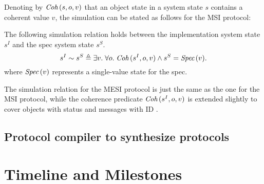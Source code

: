Denoting by $\textit{Coh}\,(s, o, v)$ that an object state in a system state $s$ contains a coherent value $v$, the simulation can be stated as follows for the MSI protocol:
\begin{theorem}
  The following simulation relation holds between the implementation system state $s^I$ and the spec system state $s^S$.
  \begin{displaymath}
    s^I \sim s^S \triangleq \exists v.\; \forall o.\; \textit{Coh}\,(s^I, o, v) \wedge s^S = \textit{Spec}\,(v).
  \end{displaymath}
  where $\textit{Spec}\,(v)$ represents a single-value state for the spec.
\end{theorem}
The simulation relation for the MESI protocol is just the same as the one for the MSI protocol, while the coherence predicate $\textit{Coh}\,(s^I, o, v)$ is extended slightly to cover objects with \stE{} status and messages with ID .

\subsection{Protocol compiler to synthesize \hemiola{} protocols}
\label{sec-synthesis}

\section{Timeline and Milestones}
